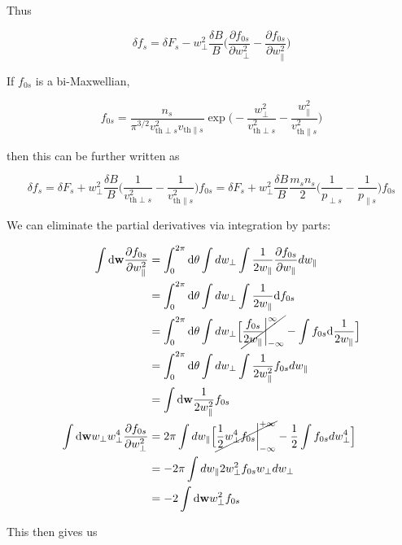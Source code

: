 \documentclass[
  notoc %
]{tufte-book}
\begin{document}
Thus

\[
\delta f_s = \delta F_s - w_\perp^2\frac{\delta B}{B}\Big(\frac{\partial f_{0s}}{\partial w_\perp^2}-\frac{\partial f_{0s}}{\partial w_\parallel^2} \Big)
\]

If \(f_{0s}\) is a bi-Maxwellian,

\[
f_{0s} = \frac{n_s}{\pi^{3/2}v_{\text{th}\perp s}^2 v_{\text{th}\parallel s}}\exp\Big(-\frac{w_\perp^2}{v_{\text{th}\perp s}^2}-\frac{w_\parallel^2}{v_{\text{th}\parallel s}^2}\Big)
\]

then this can be further written as

\[
\delta f_s = \delta F_s + w_\perp^2\frac{\delta B}{B}\Big(\frac{1}{v_{\text{th}\perp s}^2} - \frac{1}{v_{\text{th}\parallel s}^2} \Big) f_{0s} = \delta F_s + w_\perp^2\frac{\delta B}{B}\frac{m_sn_s}{2}\Big(\frac{1}{p_{\perp s}} - \frac{1}{p_{\parallel s}} \Big) f_{0s}
\]

We can eliminate the partial derivatives via integration by parts:

\[
\begin{aligned}
\int \mathrm{d}\mathbf{w}\frac{\partial f_{0s}}{\partial w_\parallel^2} &= \int_0^{2\pi}\mathrm{d}\theta \int dw_\perp\int \frac{1}{2w_\parallel}\frac{\partial f_{0s}}{\partial w_\parallel}dw_\parallel \\
&= \int_0^{2\pi}\mathrm{d}\theta \int dw_\perp\int\frac{1}{2w_\parallel}\mathrm{d} f_{0s} \\
&= \int_0^{2\pi}\mathrm{d}\theta \int dw_\perp\Big[\cancel{\frac{f_{0s}}{2w_\parallel}\bigg\rvert_{-\infty}^{\infty}} - \int f_{0s}\mathrm{d}\frac{1}{2w_\parallel}\Big] \\
&= \int_0^{2\pi}\mathrm{d}\theta \int dw_\perp\int\frac{1}{2w_\parallel^2}f_{0s}dw_\parallel \\
&= \int \mathrm{d}\mathbf{w} \frac{1}{2w_\parallel^2}f_{0s} \\
\int \mathrm{d}\mathbf{w}w_\perp w_\perp^4\frac{\partial f_{0s}}{\partial w_\perp^2} &= 2\pi\int dw_\parallel \Big[ \cancel{\frac{1}{2}w_\perp^4f_{0s}\bigg\rvert_{-\infty}^{+\infty}} - \frac{1}{2}\int f_{0s}dw_\perp^4 \Big] \\
&= -2\pi\int dw_\parallel 2w_\perp^2 f_{0s}w_\perp dw_\perp \\
&= -2 \int \mathrm{d}\mathbf{w} w_\perp^2 f_{0s}
\end{aligned}
\]

This then gives us
\end{document}
